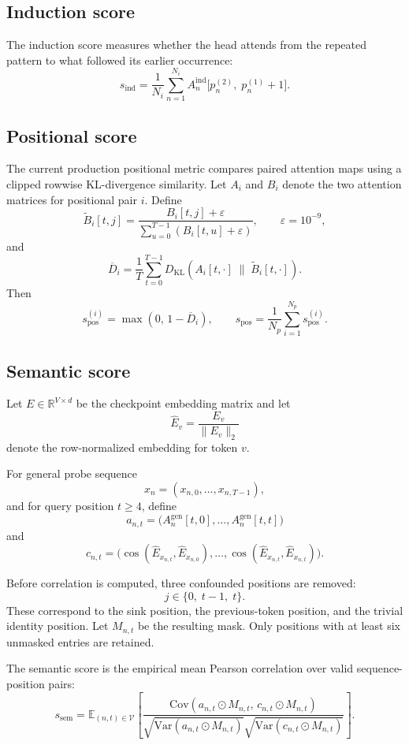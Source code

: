 \documentclass[11pt]{article}
\newcommand{\E}{\mathbb{E}}
\newcommand{\Var}{\mathrm{Var}}
\newcommand{\Cov}{\mathrm{Cov}}
\newcommand{\KL}{D_{\mathrm{KL}}}
\newcommand{\1}{\mathbf{1}}
\newcommand{\RR}{\mathbb{R}}
\begin{document}
\subsection{Induction score}

The induction score measures whether the head attends from the repeated pattern
to what followed its earlier occurrence:
\[
s_{\mathrm{ind}}
=
\frac{1}{N_i}
\sum_{n=1}^{N_i}
A_n^{\mathrm{ind}}\bigl[p_n^{(2)},\; p_n^{(1)} + 1\bigr].
\]

\subsection{Positional score}

The current production positional metric compares paired attention maps using a
clipped rowwise KL-divergence similarity. Let $A_i$ and $B_i$ denote the two
attention matrices for positional pair $i$. Define
\[
\widetilde{B}_i[t,j]
=
\frac{B_i[t,j]+\varepsilon}{\sum_{u=0}^{T-1}(B_i[t,u]+\varepsilon)},
\qquad
\varepsilon = 10^{-9},
\]
and
\[
\overline{D}_i
=
\frac{1}{T}
\sum_{t=0}^{T-1}
\KL\!\left(A_i[t,\cdot]\;\|\;\widetilde{B}_i[t,\cdot]\right).
\]
Then
\[
s_{\mathrm{pos}}^{(i)} = \max(0,\,1-\overline{D}_i),
\qquad
s_{\mathrm{pos}} = \frac{1}{N_p}\sum_{i=1}^{N_p} s_{\mathrm{pos}}^{(i)}.
\]

\subsection{Semantic score}

Let $E \in \RR^{V \times d}$ be the checkpoint embedding matrix and let
\[
\widehat{E}_v = \frac{E_v}{\lVert E_v \rVert_2}
\]
denote the row-normalized embedding for token $v$.

For general probe sequence
\[
x_n = (x_{n,0},\dots,x_{n,T-1}),
\]
and for query position $t \ge 4$, define
\[
a_{n,t} = \bigl(A_n^{\mathrm{gen}}[t,0],\dots,A_n^{\mathrm{gen}}[t,t]\bigr)
\]
and
\[
c_{n,t}
=
\bigl(
\cos(\widehat{E}_{x_{n,t}},\widehat{E}_{x_{n,0}}),\dots,
\cos(\widehat{E}_{x_{n,t}},\widehat{E}_{x_{n,t}})
\bigr).
\]

Before correlation is computed, three confounded positions are removed:
\[
j \in \{0,\; t-1,\; t\}.
\]
These correspond to the sink position, the previous-token position, and the
trivial identity position. Let $M_{n,t}$ be the resulting mask. Only positions
with at least six unmasked entries are retained.

The semantic score is the empirical mean Pearson correlation over valid
sequence-position pairs:
\[
s_{\mathrm{sem}}
=
\E_{(n,t)\in\mathcal{V}}
\left[
\frac{\Cov(a_{n,t}\odot M_{n,t},\,c_{n,t}\odot M_{n,t})}
{\sqrt{\Var(a_{n,t}\odot M_{n,t})}\sqrt{\Var(c_{n,t}\odot M_{n,t})}}
\right].
\]
\end{document}
